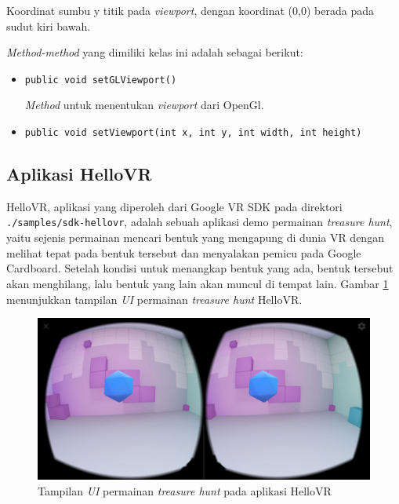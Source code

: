 \begin{enumerate}
\begin{itemize}
			Koordinat sumbu y titik pada \textit{viewport}, dengan koordinat (0,0) berada pada sudut kiri bawah.
		\end{itemize}
			
		\textit{Method-method} yang dimiliki kelas ini adalah sebagai berikut:
		
		\begin{itemize}			
			\item \texttt{public void setGLViewport()}
			
			\textit{Method} untuk menentukan \textit{viewport} dari OpenGl.
			
			\item \texttt{public void setViewport(int x, int y, int width, int height)}
		\end{itemize}
	\end{enumerate}

\subsection{Aplikasi HelloVR}
\label{subs:hello-vr}
HelloVR, aplikasi yang diperoleh dari Google VR SDK pada direktori \texttt{./samples/sdk-hellovr}, adalah sebuah aplikasi demo permainan \textit{treasure hunt}, yaitu sejenis permainan mencari bentuk yang mengapung di dunia VR dengan melihat tepat pada bentuk tersebut dan menyalakan pemicu pada Google Cardboard. Setelah kondisi untuk menangkap bentuk yang ada, bentuk tersebut akan menghilang, lalu bentuk yang lain akan muncul di tempat lain. Gambar \ref{fig:treasure-hunt} menunjukkan tampilan \textit{UI} permainan \textit{treasure hunt} HelloVR. 

\begin{figure}[h]
	\centering
		\includegraphics[width=6in]{Gambar/treasure_hunt.jpg}
	\caption{Tampilan \textit{UI} permainan \textit{treasure hunt} pada aplikasi HelloVR}
	\label{fig:treasure-hunt}
\end{figure}

